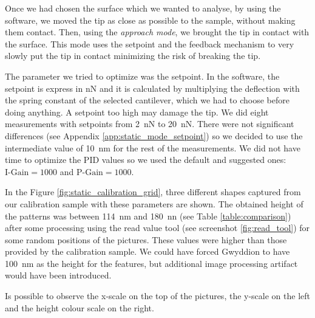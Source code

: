 \documentclass[11pt,a4paper]{article}
\begin{document}
Once we had chosen the surface which we wanted to analyse, by using the software, we moved the tip as close as possible to the sample, without making them contact. Then, using the \emph{approach mode}, we brought the tip in contact with the surface. This mode uses the setpoint and the feedback mechanism to very slowly put the tip in contact minimizing the risk of breaking the tip.

The parameter we tried to optimize was the setpoint. In the software, the setpoint is express in \si{\nano N} and it is calculated by multiplying the deflection with the spring constant of the selected cantilever, which we had to choose before doing anything. A setpoint too high may damage the tip. We did eight measurements with setpoints from \SI{2}{\nano N} to \SI{20}{\nano N}. There were not significant differences (see Appendix \ref{app:static_mode_setpoint}) so we decided to use the intermediate value of \SI{10}{\nano\m} for the rest of the measurements. We did not have time to optimize the PID values so we used the default and suggested ones: $\text{I-Gain}=1000$ and $\text{P-Gain}=1000$.

In the Figure \ref{fig:static_calibration_grid}, three different shapes captured from our calibration sample with these parameters are shown. The obtained height of the patterns was between \SI{114}{\nano m} and \SI{180}{\nano n} (see Table \ref{table:comparison}) after some processing using the read value tool (see screenshot \ref{fig:read_tool}) for some random positions of the pictures. These values were higher than those provided by the calibration sample. We could have forced Gwyddion to have \SI{100}{\nano m} as the height for the features, but additional image processing artifact would have been introduced.

Is possible to observe the x-scale on the top of the pictures, the y-scale on the left and the height colour scale on the right.
\end{document}
